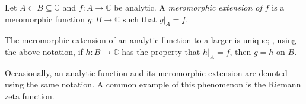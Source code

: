 \documentclass[12pt]{article}
\begin{document}
Let $A \subset B \subseteq \mathbb{C}$ and $f \colon A \to \mathbb{C}$ be analytic.  A {\em meromorphic extension of $f$} is a meromorphic function $g \colon B \to \mathbb{C}$ such that $g|_A=f$.

The meromorphic extension of an analytic function to a larger  is unique; , using the above notation, if $h \colon B \to \mathbb{C}$ has the property that $h|_A=f$, then $g=h$ on $B$.

Occasionally, an analytic function and its meromorphic extension are denoted using the same notation.  A common example of this phenomenon is the Riemann zeta function.
\end{document}
